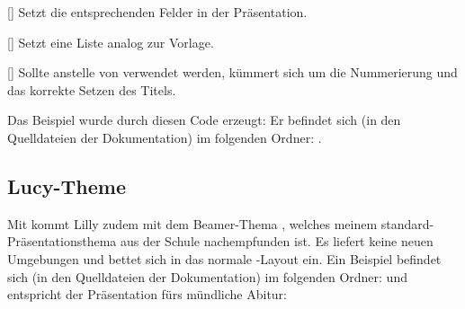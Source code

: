 %
%
%

[\cmdlist{}\cmdlist{}\secline{}\cmdlist{}\cmdlist{}\cmdlist\secline{}\cmdlist{}\cmdlist\secline{}\cmdlist{}\cmdlist\secline{}\cmdlist{}\cmdlist\secline{}]
Setzt die entsprechenden Felder in der Präsentation.

%
%
%

[]
Setzt eine Liste analog zur Vorlage.

%
%
%

[]
Sollte anstelle von  verwendet werden, kümmert sich um die Nummerierung und das korrekte Setzen des Titels.

\begin{bemerkung}
    Das  Beispiel wurde durch diesen Code erzeugt:
    Er befindet sich (in den Quelldateien der Dokumentation) im folgenden Ordner:  .
\end{bemerkung}

\subsection{Lucy-Theme}
Mit  kommt Lilly zudem mit dem Beamer-Thema , welches meinem standard-Präsentationsthema aus der Schule nachempfunden ist. Es liefert keine neuen Umgebungen und bettet sich in das normale -Layout ein. Ein Beispiel befindet sich (in den Quelldateien der Dokumentation) im folgenden Ordner:  und entspricht der Präsentation fürs mündliche Abitur:
\begin{tcbraster}[raster columns=3, blankest, graphics pages={4,8,16,20,28,34}, colback=white]
\end{tcbraster}

